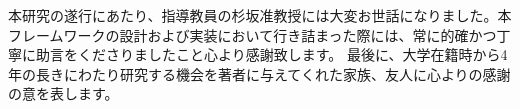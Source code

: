本研究の遂行にあたり、指導教員の杉坂准教授には大変お世話になりました。本フレームワークの設計および実装において行き詰まった際には、常に的確かつ丁寧に助言をくださりましたこと心より感謝致します。
最後に、大学在籍時から4年の長きにわたり研究する機会を著者に与えてくれた家族、友人に心よりの感謝の意を表します。

